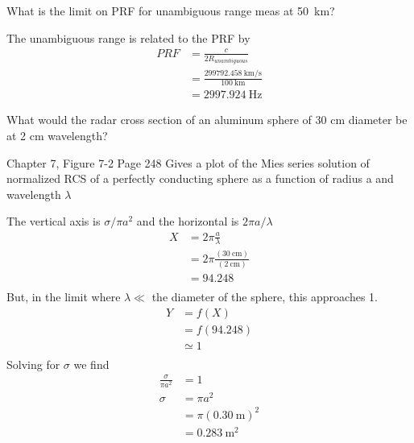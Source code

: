 \documentclass[12pt]{article}
\newenvironment{exercise}[2][Exercise]{\begin{trivlist}
    \item[\hskip \labelsep {\bfseries #1}\hskip \labelsep {\bfseries #2.}]}{\end{trivlist}}
\begin{document}
      \begin{exercise}{11}
      What is the limit on PRF for unambiguous range meas at \SI{50}{\km}?

      The unambiguous range is related to the PRF by
      \begin{align*}
      PRF & = \frac{c}{2 R_{unambiguous}}\\
      & = \frac{\SI{299792.458}{\km\per\second}}{\SI{100}{\km}}\\
      & = \SI{2997.924}{\Hz}
      \end{align*}
      \end{exercise}
      
      \begin{exercise}{12}
      What would the radar cross section of an aluminum sphere of 30 cm diameter be at 2 cm wavelength?
      
      Chapter 7, Figure 7-2 Page 248
      Gives a plot of the Mies series solution of normalized RCS of a perfectly conducting sphere as a function of radius a and wavelength $\lambda$
      
      The vertical axis is $\sigma/\pi a^{2}$ and the horizontal is $2\pi a / \lambda$
      \begin{align*}
      X & = 2\pi\frac{ a}{\lambda}\\
      & = 2\pi\frac{(\SI{30}{\cm})}{(\SI{2}{\cm})}\\
      & = 94.248\\
      \end{align*}
      But, in the limit where $\lambda \ll$ the diameter of the sphere, this approaches 1.
      \begin{align*}
      Y &= f(X) \\
      & = f(94.248)\\
      & \simeq 1\\
      \end{align*}
      Solving for $\sigma$ we find
      \begin{align*}
      \frac{\sigma}{\pi a^{2}} & = 1 \\
      \sigma & = \pi a^{2}\\
      & = \pi (\SI{0.30}{\meter})^{2}\\
      & = \SI{0.283}{\meter\squared}
      \end{align*}
      \end{exercise}
      
\end{document}
